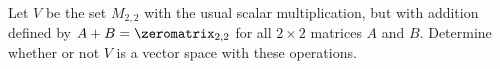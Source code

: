 %
Let $V$ be the set $M_{2,2}$ with the usual  scalar multiplication, but with addition defined by 
$A + B = \zeromatrix_{2,2}$ for all $2 \times 2$ matrices $A$ and $B$.
Determine whether or not $V$ is a vector space with these operations. 
